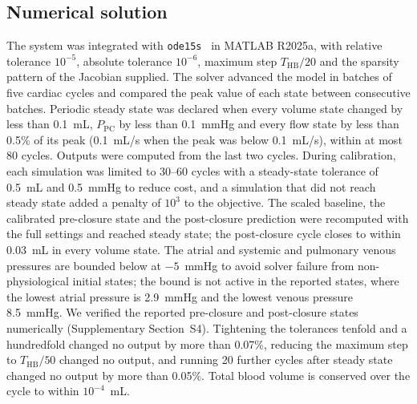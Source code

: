 \FloatBarrier
\subsection{Numerical solution}
\label{sec:numerics}
The system was integrated with \texttt{ode15s}~\cite{Shampine1997} in MATLAB R2025a, with relative tolerance $10^{-5}$, absolute tolerance $10^{-6}$, maximum step $T_{\mathrm{HB}}/20$ and the sparsity pattern of the Jacobian supplied. The solver advanced the model in batches of five cardiac cycles and compared the peak value of each state between consecutive batches. Periodic steady state was declared when every volume state changed by less than 0.1~mL, $P_{\mathrm{PC}}$ by less than 0.1~mmHg and every flow state by less than 0.5\% of its peak (0.1~mL/s when the peak was below 0.1~mL/s), within at most 80 cycles. Outputs were computed from the last two cycles. During calibration, each simulation was limited to 30--60 cycles with a steady-state tolerance of 0.5~mL and 0.5~mmHg to reduce cost, and a simulation that did not reach steady state added a penalty of $10^{3}$ to the objective. The scaled baseline, the calibrated pre-closure state and the post-closure prediction were recomputed with the full settings and reached steady state; the post-closure cycle closes to within 0.03~mL in every volume state. The atrial and systemic and pulmonary venous pressures are bounded below at $-5$~mmHg to avoid solver failure from non-physiological initial states; the bound is not active in the reported states, where the lowest atrial pressure is 2.9~mmHg and the lowest venous pressure 8.5~mmHg. We verified the reported pre-closure and post-closure states numerically (Supplementary Section~S4). Tightening the tolerances tenfold and a hundredfold changed no output by more than 0.07\%, reducing the maximum step to $T_{\mathrm{HB}}/50$ changed no output, and running 20 further cycles after steady state changed no output by more than 0.05\%. Total blood volume is conserved over the cycle to within $10^{-4}$~mL.

\FloatBarrier
